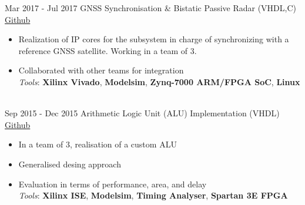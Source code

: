 \documentclass[letterpaper]{twentysecondcv} %
\begin{document}
\begin{twenty}
	\twentyitem
    	{Mar 2017 -}
		{Jul 2017}
        {GNSS Synchronisation \& Bistatic Passive Radar (VHDL,C)}
        {\href{https://github.com/artic92/sistemi-embedded-task2}{Github}}
        {}
        {
            \begin{itemize}
                \item Realization of IP cores for the subsystem in charge of synchronizing with a reference GNSS satellite. Working in a team of 3.
                \item Collaborated with other teams for integration \\
                \textit{Tools}: \textbf{Xilinx Vivado}, \textbf{Modelsim}, \textbf{Zynq-7000 ARM/FPGA SoC}, \textbf{Linux}
		    \end{itemize}
        }\\
	\twentyitem
    	{Sep 2015 -}
		{Dec 2015}
        {Arithmetic Logic Unit (ALU) Implementation (VHDL)}
        {\href{https://github.com/artic92/alu_xilinx}{Github}}
        {}
        {
            \begin{itemize}
                \item In a team of 3, realisation of a custom ALU
                \item Generalised desing approach
                \item Evaluation in terms of performance, area, and delay \\
                \textit{Tools}: \textbf{Xilinx ISE}, \textbf{Modelsim}, \textbf{Timing Analyser}, \textbf{Spartan 3E FPGA}
		    \end{itemize}
}
\end{twenty}
\end{document}
